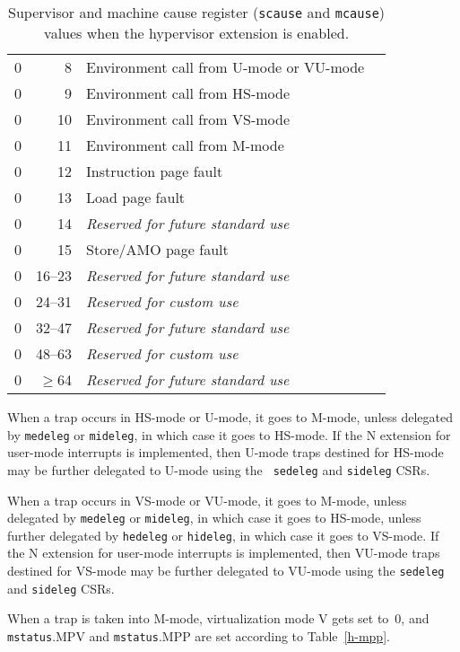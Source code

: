 \begin{table*}[h!]
\begin{center}
\begin{tabular}{|r|r|l|l|}
  0         & 8               & Environment call from U-mode or VU-mode \\
  0         & 9               & Environment call from HS-mode \\
  0         & 10              & Environment call from VS-mode \\
  0         & 11              & Environment call from M-mode \\
  0         & 12              & Instruction page fault \\
  0         & 13              & Load page fault \\
  0         & 14              & {\em Reserved for future standard use} \\
  0         & 15              & Store/AMO page fault \\
  0         & 16--23          & {\em Reserved for future standard use} \\
  0         & 24--31          & {\em Reserved for custom use} \\
  0         & 32--47          & {\em Reserved for future standard use} \\
  0         & 48--63          & {\em Reserved for custom use} \\
  0         & $\ge$64         & {\em Reserved for future standard use} \\
  \hline
\end{tabular}
\end{center}
\caption{Supervisor and machine cause register ({\tt scause} and {\tt mcause}) values when the hypervisor extension is enabled.}
\label{hcauses}
\end{table*}

When a trap occurs in HS-mode or U-mode, it goes to M-mode, unless
delegated by {\tt medeleg} or {\tt mideleg}, in which case it goes to HS-mode.
If the N extension for user-mode interrupts is implemented, then U-mode
traps destined for HS-mode may be further delegated to U-mode using the {\tt
sedeleg} and {\tt sideleg} CSRs.

When a trap occurs in VS-mode or VU-mode, it goes to M-mode, unless
delegated by {\tt medeleg} or {\tt mideleg}, in which case it goes to HS-mode,
unless further delegated by {\tt hedeleg} or {\tt hideleg}, in which case it
goes to VS-mode.  If the N extension for user-mode interrupts is implemented,
then VU-mode traps destined for VS-mode may be further delegated to VU-mode
using the {\tt sedeleg} and {\tt sideleg} CSRs.

When a trap is taken into M-mode, virtualization mode V gets set to~0,
and {\tt mstatus}.MPV and {\tt mstatus}.MPP are set according to
Table~\ref{h-mpp}.

